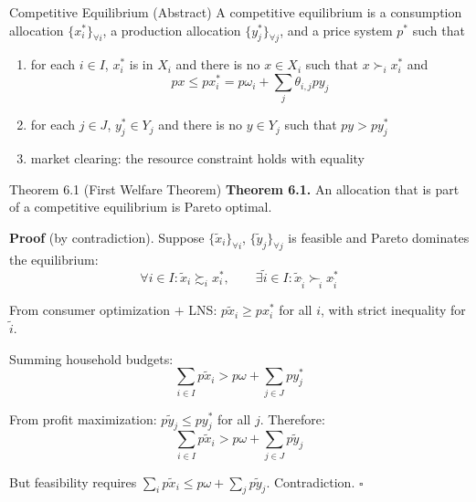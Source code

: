 \documentclass[blue]{beamer}
\begin{document}
\begin{frame}{Competitive Equilibrium (Abstract)}
	A competitive equilibrium is a consumption allocation $\{x_i^*\}_{\forall i}$, a production allocation $\{y_j^*\}_{\forall j}$, and a price system $p^*$ such that
	
	\begin{enumerate}
		\item for each $i \in I$, $x_i^*$ is in $X_i$ and there is no $x \in X_i$ such that $x \succ_i x_i^*$ and
		\[
		px \leq px_i^* = p\omega_i + \sum_{j} \theta_{i,j} p y_j
		\]
		
		\item for each $j \in J$, $y_j^* \in Y_j$ and there is no $y \in Y_j$ such that $py > py_j^*$
		
		\item market clearing: the resource constraint holds with equality
	\end{enumerate}
\end{frame}

\begin{frame}{Theorem 6.1 (First Welfare Theorem)}
	\textbf{Theorem 6.1.} An allocation that is part of a competitive equilibrium is Pareto optimal.

	\textbf{Proof} (by contradiction). Suppose $\{\tilde{x}_i\}_{\forall i}$, $\{\tilde{y}_j\}_{\forall j}$ is feasible and Pareto dominates the equilibrium:
	\[
	\forall i \in I: \tilde{x}_i \succsim_i x_i^*, \qquad \exists \tilde{i} \in I: \tilde{x}_{\tilde{i}} \succ_{\tilde{i}} x_{\tilde{i}}^*
	\]
	
	\vspace{-10pt}
	From consumer optimization $+$ LNS: $p\tilde{x}_i \geq px_i^*$ for all $i$, with strict inequality for $\tilde{i}$.
	
			\vspace{-4pt}
	Summing household budgets:
	\[
	\sum_{i \in I} p\tilde{x}_i > p\omega + \sum_{j \in J} py_j^*
	\]
	
		\vspace{-8pt}
	From profit maximization: $p\tilde{y}_j \leq py_j^*$ for all $j$. Therefore:
	\[
	\sum_{i \in I} p\tilde{x}_i > p\omega + \sum_{j \in J} p\tilde{y}_j
	\]
	
		\vspace{-8pt}
	But feasibility requires $\sum_i p\tilde{x}_i \leq p\omega + \sum_j p\tilde{y}_j$. Contradiction. $\square$
\end{frame}
\end{document}
